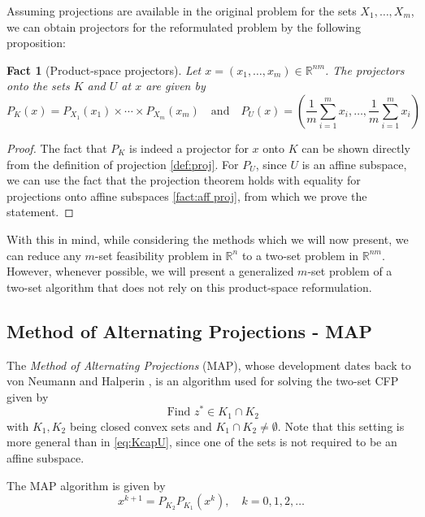\documentclass[smallextended,numbook,nospthms]{svjour3}
\theoremstyle{plain}
\newtheorem{fact}[theorem]{Fact}
\theoremstyle{definition}
\def\RR{\mathds R}
\begin{document}
Assuming projections are available in the original problem for the sets $X_{1}, \ldots, X_{m}$, we can obtain projectors for the reformulated problem by the following proposition:
\begin{fact}[Product-space projectors]\label{fact:Pierra proj}
Let $x=\left(x_{1}, \ldots, x_{m}\right) \in \RR^{nm}$. The projectors onto the sets $K$ and $U$ at $x$ are given by
\[
P_{K}(x)=P_{X_{1}}\left(x_{1}\right) \times \cdots \times P_{X_{m}}\left(x_{m}\right) \quad \text {and} \quad P_{U}(x)=\left(\frac{1}{m} \sum_{i=1}^{m} x_{i}, \ldots, \frac{1}{m} \sum_{i=1}^{m} x_{i}\right)
\]
\end{fact}
\begin{proof}
	The fact that $P_{K}$ is indeed a projector for $x$ onto $K$ can be shown directly from the definition of projection \cref{def:proj}. For $P_{U}$, since $U$ is an affine subspace, we can use the fact that the projection theorem holds with equality for projections onto affine subspaces \cref{fact:aff proj}, from which we prove the statement.
\end{proof}
With this in mind, while considering the methods which we will now present, we can reduce any $m$-set feasibility problem in $\RR^{n}$ to a two-set problem in $\RR^{nm}$. However, whenever possible, we will present a generalized $m$-set problem of a two-set algorithm that does not rely on this product-space reformulation.

\subsection{Method of Alternating Projections - MAP}\label{subsec:MAP}

The \emph{Method of Alternating Projections} (MAP), whose development dates back to von Neumann \cite{Neumann:1950} and Halperin \cite{Halperin:1962ut}, is an algorithm used for solving the two-set CFP given by
$$
\text { Find } z^{*} \in K_1 \cap K_2
$$
with $K_1, K_2$ being closed convex sets and $K_1 \cap K_2 \not = \emptyset$.
Note that this setting is more general than in \cref{eq:KcapU}, since one of the sets is not required to be an affine subspace.

The MAP algorithm is given by
\begin{equation}
	x^{k+1}=P_{K_{2}}P_{K_{1}}\left(x^{k}\right), \quad k=0,1,2, \ldots \label{eq:MAP}
\end{equation}
\end{document}
